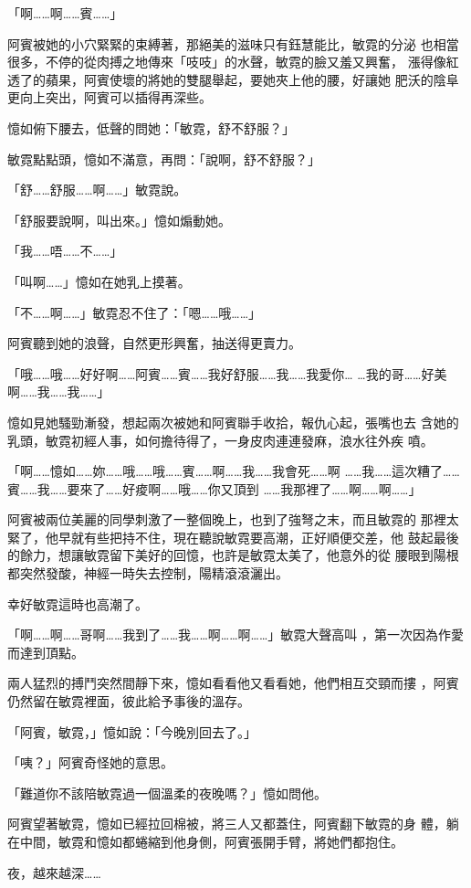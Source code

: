 「啊……啊……賓……」

阿賓被她的小穴緊緊的束縛著，那絕美的滋味只有鈺慧能比，敏霓的分泌
也相當很多，不停的從肉搏之地傳來「吱吱」的水聲，敏霓的臉又羞又興奮，
漲得像紅透了的蘋果，阿賓使壞的將她的雙腿舉起，要她夾上他的腰，好讓她
肥沃的陰阜更向上突出，阿賓可以插得再深些。

憶如俯下腰去，低聲的問她：「敏霓，舒不舒服？」

敏霓點點頭，憶如不滿意，再問：「說啊，舒不舒服？」

「舒……舒服……啊……」敏霓說。

「舒服要說啊，叫出來。」憶如煽動她。

「我……唔……不……」

「叫啊……」憶如在她乳上摸著。

「不……啊……」敏霓忍不住了：「嗯……哦……」

阿賓聽到她的浪聲，自然更形興奮，抽送得更賣力。

「哦……哦……好好啊……阿賓……賓……我好舒服……我……我愛你…
…我的哥……好美啊……我……我……」

憶如見她騷勁漸發，想起兩次被她和阿賓聯手收拾，報仇心起，張嘴也去
含她的乳頭，敏霓初經人事，如何擔待得了，一身皮肉連連發麻，浪水往外疾
噴。

「啊……憶如……妳……哦……哦……賓……啊……我……我會死……啊
……我……這次糟了……賓……我……要來了……好痠啊……哦……你又頂到
……我那裡了……啊……啊……」

阿賓被兩位美麗的同學刺激了一整個晚上，也到了強弩之末，而且敏霓的
那裡太緊了，他早就有些把持不住，現在聽說敏霓要高潮，正好順便交差，他
鼓起最後的餘力，想讓敏霓留下美好的回憶，也許是敏霓太美了，他意外的從
腰眼到陽根都突然發酸，神經一時失去控制，陽精滾滾灑出。

幸好敏霓這時也高潮了。

「啊……啊……哥啊……我到了……我……啊……啊……」敏霓大聲高叫
，第一次因為作愛而達到頂點。

兩人猛烈的搏鬥突然間靜下來，憶如看看他又看看她，他們相互交頸而摟
，阿賓仍然留在敏霓裡面，彼此給予事後的溫存。

「阿賓，敏霓，」憶如說：「今晚別回去了。」

「咦？」阿賓奇怪她的意思。

「難道你不該陪敏霓過一個溫柔的夜晚嗎？」憶如問他。

阿賓望著敏霓，憶如已經拉回棉被，將三人又都蓋住，阿賓翻下敏霓的身
體，躺在中間，敏霓和憶如都蜷縮到他身側，阿賓張開手臂，將她們都抱住。

夜，越來越深……










